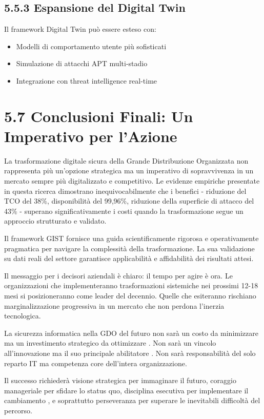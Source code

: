 \subsection{5.5.3 Espansione del Digital Twin}

Il framework Digital Twin può essere esteso con:
\begin{itemize}
\item Modelli di comportamento utente più sofisticati
\item Simulazione di attacchi APT multi-stadio  
\item Integrazione con threat intelligence real-time
\end{itemize}

\section{5.7 Conclusioni Finali: Un Imperativo per l'Azione}

La trasformazione digitale sicura della Grande Distribuzione Organizzata non rappresenta più un'opzione strategica ma un imperativo di sopravvivenza in un mercato sempre più digitalizzato e competitivo. Le evidenze empiriche presentate in questa ricerca dimostrano inequivocabilmente che i benefici - riduzione del TCO del 38\%, disponibilità del 99,96\%, riduzione della superficie di attacco del 43\% - superano significativamente i costi quando la trasformazione segue un approccio strutturato e validato.

Il framework GIST fornisce una guida scientificamente rigorosa e operativamente pragmatica per navigare la complessità della trasformazione. La sua validazione su dati reali del settore garantisce applicabilità e affidabilità dei risultati attesi.

Il messaggio per i decisori aziendali è chiaro: il tempo per agire è ora. Le organizzazioni che implementeranno trasformazioni sistemiche nei prossimi 12-18 mesi si posizioneranno come leader del decennio. Quelle che esiteranno rischiano marginalizzazione progressiva in un mercato che non perdona l'inerzia tecnologica.

La sicurezza informatica nella GDO del futuro non sarà un costo da minimizzare ma un investimento strategico da ottimizzare \autocite{forrester2024cloud}. Non sarà un vincolo all'innovazione ma il suo principale abilitatore \autocite{gartner2024market}. Non sarà responsabilità del solo reparto IT ma competenza core dell'intera organizzazione.

Il successo richiederà visione strategica per immaginare il futuro, coraggio manageriale per sfidare lo status quo, disciplina esecutiva per implementare il cambiamento \autocite{mckinsey2023}, e soprattutto perseveranza per superare le inevitabili difficoltà del percorso.

